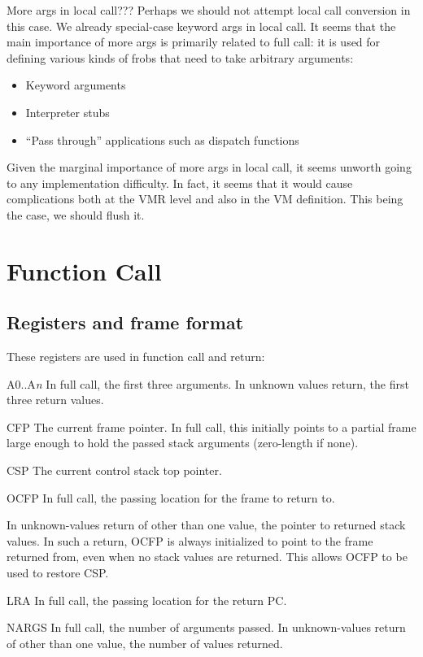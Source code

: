More args in local call???  Perhaps we should not attempt local call conversion
in this case.  We already special-case keyword args in local call.  It seems
that the main importance of more args is primarily related to full call: it is
used for defining various kinds of frobs that need to take arbitrary arguments:
\begin{itemize}
\item Keyword arguments
\item Interpreter stubs
\item ``Pass through'' applications such as dispatch functions
\end{itemize}
Given the marginal importance of more args in local call, it seems unworth
going to any implementation difficulty.  In fact, it seems that it would cause
complications both at the VMR level and also in the VM definition.  This being
the case, we should flush it.


\section{Function Call}


\subsection{Registers and frame format}

These registers are used in function call and return:

A0..A{\it n}
    In full call, the first three arguments.  In unknown values return, the
    first three return values.

CFP
    The current frame pointer.  In full call, this initially points to a
    partial frame large enough to hold the passed stack arguments (zero-length
    if none).

CSP
    The current control stack top pointer. 

OCFP
    In full call, the passing location for the frame to return to.

    In unknown-values return of other than one value, the pointer to returned
    stack values.  In such a return, OCFP is always initialized to point to
    the frame returned from, even when no stack values are returned.  This
    allows OCFP to be used to restore CSP.

LRA
    In full call, the passing location for the return PC.

NARGS
    In full call, the number of arguments passed.  In unknown-values return of
    other than one value, the number of values returned.

